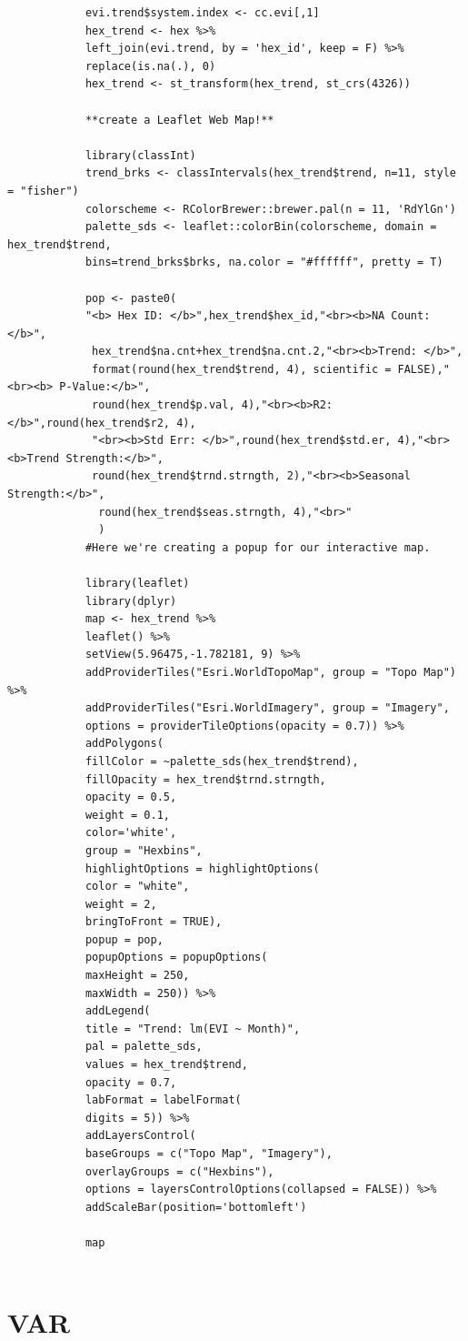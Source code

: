 \documentclass[12pt,a4paper]{book}
\begin{document}
\begin{verbatim}
			evi.trend$system.index <- cc.evi[,1]
			hex_trend <- hex %>%
			left_join(evi.trend, by = 'hex_id', keep = F) %>%
			replace(is.na(.), 0)
			hex_trend <- st_transform(hex_trend, st_crs(4326))	
			
			**create a Leaflet Web Map!**			
			
			library(classInt)
			trend_brks <- classIntervals(hex_trend$trend, n=11, style = "fisher")
			colorscheme <- RColorBrewer::brewer.pal(n = 11, 'RdYlGn')
			palette_sds <- leaflet::colorBin(colorscheme, domain = hex_trend$trend, 
			bins=trend_brks$brks, na.color = "#ffffff", pretty = T)
			
			pop <- paste0(
			"<b> Hex ID: </b>",hex_trend$hex_id,"<br><b>NA Count:</b>",
			 hex_trend$na.cnt+hex_trend$na.cnt.2,"<br><b>Trend: </b>",
			 format(round(hex_trend$trend, 4), scientific = FALSE),"<br><b> P-Value:</b>",
			 round(hex_trend$p.val, 4),"<br><b>R2: </b>",round(hex_trend$r2, 4),
			 "<br><b>Std Err: </b>",round(hex_trend$std.er, 4),"<br><b>Trend Strength:</b>",
			 round(hex_trend$trnd.strngth, 2),"<br><b>Seasonal Strength:</b>",
			  round(hex_trend$seas.strngth, 4),"<br>"
			  )
			#Here we're creating a popup for our interactive map.			
			
			library(leaflet)
			library(dplyr)
			map <- hex_trend %>%
			leaflet() %>%
			setView(5.96475,-1.782181, 9) %>%
			addProviderTiles("Esri.WorldTopoMap", group = "Topo Map") %>%
			addProviderTiles("Esri.WorldImagery", group = "Imagery", 
			options = providerTileOptions(opacity = 0.7)) %>%
			addPolygons(
			fillColor = ~palette_sds(hex_trend$trend),
			fillOpacity = hex_trend$trnd.strngth,
			opacity = 0.5,
			weight = 0.1,
			color='white', 
			group = "Hexbins", 
			highlightOptions = highlightOptions(
			color = "white",
			weight = 2,
			bringToFront = TRUE),
			popup = pop,
			popupOptions = popupOptions(
			maxHeight = 250, 
			maxWidth = 250)) %>%
			addLegend(
			title = "Trend: lm(EVI ~ Month)",
			pal = palette_sds,
			values = hex_trend$trend,
			opacity = 0.7,
			labFormat = labelFormat(
			digits = 5)) %>%
			addLayersControl(
			baseGroups = c("Topo Map", "Imagery"),
			overlayGroups = c("Hexbins"),
			options = layersControlOptions(collapsed = FALSE)) %>%
			addScaleBar(position='bottomleft')
			
			map
			
		\end{verbatim}
	\section{VAR}
	
\end{document}
